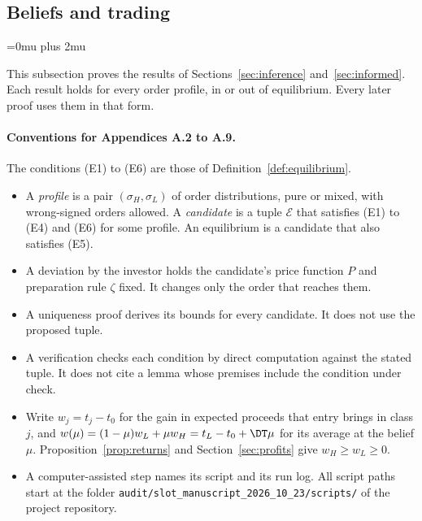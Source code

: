 \subsection{Beliefs and trading}\label{app:beliefs}

\Urlmuskip=0mu plus 2mu
\setlength{\emergencystretch}{1.5em}

This subsection proves the results of Sections~\ref{sec:inference} and~\ref{sec:informed}. Each result holds
for every order profile, in or out of equilibrium. Every later proof uses them in that form.

\paragraph{Conventions for Appendices A.2 to A.9.}
The conditions (E1) to (E6) are those of Definition~\ref{def:equilibrium}.
\begin{itemize}[leftmargin=2em]
\item A \emph{profile} is a pair \((\sigma_H,\sigma_L)\) of order distributions, pure or mixed, with wrong-signed
orders allowed. A \emph{candidate} is a tuple \(\mathcal E\) that satisfies (E1) to (E4) and (E6) for some
profile. An equilibrium is a candidate that also satisfies (E5).
\item A deviation by the investor holds the candidate's price function \(P\) and preparation rule \(\zeta\) fixed.
It changes only the order that reaches them.
\item A uniqueness proof derives its bounds for every candidate. It does not use the proposed tuple.
\item A verification checks each condition by direct computation against the stated tuple. It does not cite a
lemma whose premises include the condition under check.
\item Write \(w_j=t_j-t_0\) for the gain in expected proceeds that entry brings in class \(j\), and
\(w(\mu)=(1-\mu)w_L+\mu w_H=t_L-t_0+\DT\mu\) for its average at the belief \(\mu\). Proposition~\ref{prop:returns}
and Section~\ref{sec:profits} give \(w_H\ge w_L\ge0\).
\item A computer-assisted step names its script and its run log. All script paths start at the folder
\nolinkurl{audit/slot_manuscript_2026_10_23/scripts/} of the project repository.
\end{itemize}

